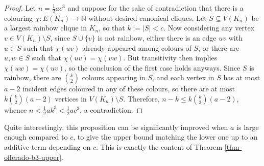 \documentclass[10pt,a4paper]{article}
\theoremstyle{plain}
\theoremstyle{definition}
\newcommand{\N}{\mathbb{N}}
\begin{document}
\begin{proof}
    Let $n=\frac{1}{2}ac^3$ and suppose for the sake of contradiction that there is a colouring $\chi:E(K_n)\to\N$ without desired canonical cliques. Let $S\subseteq V(K_n)$ be a largest rainbow clique in $K_n$, so that $k:=|S|<c$. Now considering any vertex $v\in V(K_n)\setminus S$, since $S\cup \{v\}$ is not rainbow, either there is an edge $uv$ with $u\in S$ such that $\chi(uv)$ already appeared among colours of $S$, or there are $u,w\in S$ such that $\chi(uv)=\chi(vw)$. But transitivity then implies $\chi(uw)=\chi(uv)$, so the conclusion of the first case holds anyways. Since $S$ is rainbow, there are $\binom{k}{2}$ colours appearing in $S$, and each vertex in $S$ has at most $a-2$ incident edges coloured in any of these colours, so there are at most $k\binom{k}{2}(a-2)$ vertices in $V(K_n)\setminus S$. Therefore, $n-k\le k\binom{k}{2}(a-2)$, whence $n<\frac{1}{2}ak^3<\frac{1}{2}ac^3$, a contradiction.
\end{proof}

Quite interestingly, this proposition can be significantly improved when $a$ is large enough compared to $c$, to give the upper bound matching the lower one up to an additive term depending on $c$. This is exactly the content of Theorem \ref{thm-offerado-b3-upper}.
\end{document}
